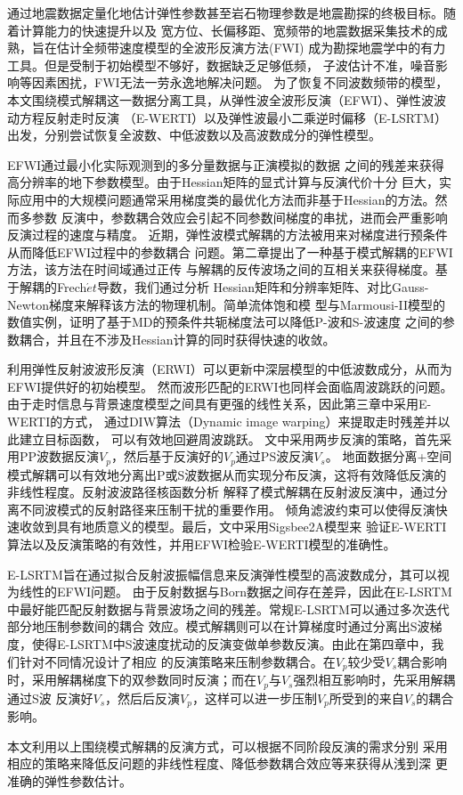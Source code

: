 \begin{cabstract}
	通过地震数据定量化地估计弹性参数甚至岩石物理参数是地震勘探的终极目标。随着计算能力的快速提升以及
	宽方位、长偏移距、宽频带的地震数据采集技术的成熟，旨在估计全频带速度模型的全波形反演方法(FWI)
	成为勘探地震学中的有力工具。但是受制于初始模型不够好，数据缺乏足够低频，
	子波估计不准，噪音影响等因素困扰，FWI无法一劳永逸地解决问题。
	为了恢复不同波数频带的模型，本文围绕模式解耦这一数据分离工具，从弹性波全波形反演（EFWI）、弹性波波动方程反射走时反演
	（E-WERTI）以及弹性波最小二乘逆时偏移（E-LSRTM）出发，分别尝试恢复全波数、中低波数以及高波数成分的弹性模型。

	EFWI通过最小化实际观测到的多分量数据与正演模拟的数据
	之间的残差来获得高分辨率的地下参数模型。由于Hessian矩阵的显式计算与反演代价十分
	巨大，实际应用中的大规模问题通常采用梯度类的最优化方法而非基于Hessian的方法。然而多参数
	反演中，参数耦合效应会引起不同参数间梯度的串扰，进而会严重影响反演过程的速度与精度。
	近期，弹性波模式解耦的方法被用来对梯度进行预条件从而降低EFWI过程中的参数耦合
	问题。第二章提出了一种基于模式解耦的EFWI方法，该方法在时间域通过正传
	与解耦的反传波场之间的互相关来获得梯度。基于解耦的Frech$\acute{e}t$导数，我们通过分析
	Hessian矩阵和分辨率矩阵、对比Gauss-Newton梯度来解释该方法的物理机制。简单流体饱和模
	型与Marmousi-II模型的数值实例，证明了基于MD的预条件共轭梯度法可以降低P-波和S-波速度
	之间的参数耦合，并且在不涉及Hessian计算的同时获得快速的收敛。

	利用弹性反射波波形反演（ERWI）可以更新中深层模型的中低波数成分，从而为EFWI提供好的初始模型。
	然而波形匹配的ERWI也同样会面临周波跳跃的问题。由于走时信息与背景速度模型之间具有更强的线性关系，因此第三章中采用E-WERTI的方式，
	通过DIW算法（Dynamic image warping）来提取走时残差并以此建立目标函数，
	可以有效地回避周波跳跃。
	文中采用两步反演的策略，首先采用PP波数据反演$V_p$，然后基于反演好的$V_p$通过PS波反演$V_s$。
	地面数据分离+空间模式解耦可以有效地分离出P或S波数据从而实现分布反演，这将有效降低反演的非线性程度。反射波波路径核函数分析
	解释了模式解耦在反射波反演中，通过分离不同波模式的反射路径来压制干扰的重要作用。
	倾角滤波约束可以使得反演快速收敛到具有地质意义的模型。最后，文中采用Sigsbee2A模型来
	验证E-WERTI算法以及反演策略的有效性，并用EFWI检验E-WERTI模型的准确性。

	E-LSRTM旨在通过拟合反射波振幅信息来反演弹性模型的高波数成分，其可以视为线性的EFWI问题。
	由于反射数据与Born数据之间存在差异，因此在E-LSRTM中最好能匹配反射数据与背景波场之间的残差。常规E-LSRTM可以通过多次迭代部分地压制参数间的耦合
	效应。模式解耦则可以在计算梯度时通过分离出S波梯度，使得E-LSRTM中S波速度扰动的反演变做单参数反演。由此在第四章中，我们针对不同情况设计了相应
	的反演策略来压制参数耦合。在$V_p$较少受$V_s$耦合影响时，采用解耦梯度下的双参数同时反演；而在$V_p$与$V_s$强烈相互影响时，先采用解耦通过S波
	反演好$V_s$，然后后反演$V_p$，这样可以进一步压制$V_p$所受到的来自$V_s$的耦合影响。

	本文利用以上围绕模式解耦的反演方式，可以根据不同阶段反演的需求分别
	采用相应的策略来降低反问题的非线性程度、降低参数耦合效应等来获得从浅到深
	更准确的弹性参数估计。


\end{cabstract}

